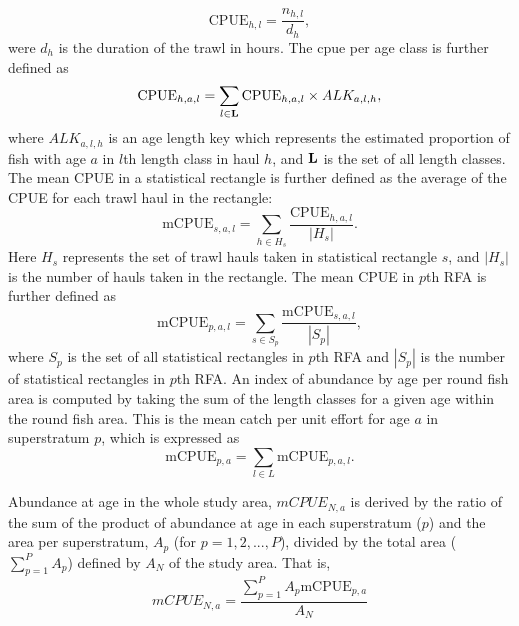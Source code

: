 \documentclass[a4paper 12pt]{article}
\numberwithin{equation}{section}
\begin{document}
\begin{equation}\label{eq:cpueHaul}
\mathrm{CPUE}_{h,l} =\frac{n_{h,l}}{d_h},
\end{equation}
were $d_h$ is the duration of the trawl in hours. The cpue per age class is further defined as
\begin{equation}\label{eq:cpueALK}
\mathrm{CPUE}_{h,a, l} =\sum_{l \in {\bf L}}\mathrm{CPUE}_{h,a, l} \times ALK_{a,l,h},
\end{equation}
where $ALK_{a,l,h}$ is an age length key which represents the estimated proportion of fish with age $a$ in $l$th length class in haul $h$, and ${\bf L}$ is the set of all length classes. The mean CPUE in a statistical rectangle is further defined as the average of the CPUE for each trawl haul in the rectangle:
\begin{equation}\label{eq:cpueRec}
\mathrm{mCPUE}_{s,a,l} =\sum_{h \in H_{s}}\frac{\mathrm{CPUE}_{h,a, l}}{|H_{s}|}.
\end{equation}
Here $H_{s}$ represents the set of trawl hauls taken in statistical rectangle $s$, and $|H_{s}|$ is the number of hauls taken in the rectangle. The mean CPUE in $p$th RFA is further defined as
\begin{equation}\label{eq:cpueRFA}
\mathrm{mCPUE}_{p,a,l} = \sum_{s \in S_{p}} \frac{\mathrm{mCPUE}_{s,a,l}}{|S_{p}|} ,
\end{equation}
where $S_{p}$ is the set of all statistical rectangles in $p$th RFA and $|S_{p}|$ is the number of statistical rectangles in $p$th RFA. An index of abundance by age per round fish area is computed by taking the sum of the length classes for a given age within the round fish area. This is the mean catch per unit effort for age $a$ in superstratum $p$, which is expressed as
\begin{equation}
\mathrm{mCPUE}_{p,a} =  \sum\limits_{l \in L} \mathrm{mCPUE}_{p,a,l}.
\label{ageIndex}
\end{equation}

Abundance at age in the whole study area, $mCPUE_{N,a} $ is derived by the ratio of the sum of the product of abundance at age in each superstratum ($p$) and the area per superstratum, $A_{p}$ (for $p=1,2,...,P$), divided by the total area ($\sum_{p=1}^{P} A_{p}$) defined by $A_{N}$ of the study area. That is,
\begin{equation}
mCPUE_{N,a} = \frac{\sum_{p=1}^{P} A_{p}  \mathrm{mCPUE}_{p,a}}{A_{N}}
\label{abundanceestimatornorthsea}
\end{equation}
 
\end{document}
